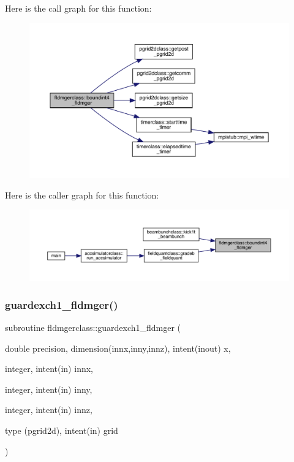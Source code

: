 Here is the call graph for this function\+:
\nopagebreak
\begin{figure}[H]
\begin{center}
\leavevmode
\includegraphics[width=350pt]{namespacefldmgerclass_a490fceb1792fb1664488b1394dcff5f0_cgraph}
\end{center}
\end{figure}
Here is the caller graph for this function\+:
\nopagebreak
\begin{figure}[H]
\begin{center}
\leavevmode
\includegraphics[width=350pt]{namespacefldmgerclass_a490fceb1792fb1664488b1394dcff5f0_icgraph}
\end{center}
\end{figure}
\mbox{\label{namespacefldmgerclass_a028236bf0d8419b6f75a7fb28eb7226b}} 
\subsubsection{\texorpdfstring{guardexch1\_fldmger()}{guardexch1\_fldmger()}}
{\footnotesize\ttfamily subroutine fldmgerclass\+::guardexch1\+\_\+fldmger (\begin{DoxyParamCaption}\item[{double precision, dimension(innx,inny,innz), intent(inout)}]{x,  }\item[{integer, intent(in)}]{innx,  }\item[{integer, intent(in)}]{inny,  }\item[{integer, intent(in)}]{innz,  }\item[{type (pgrid2d), intent(in)}]{grid }\end{DoxyParamCaption})}



